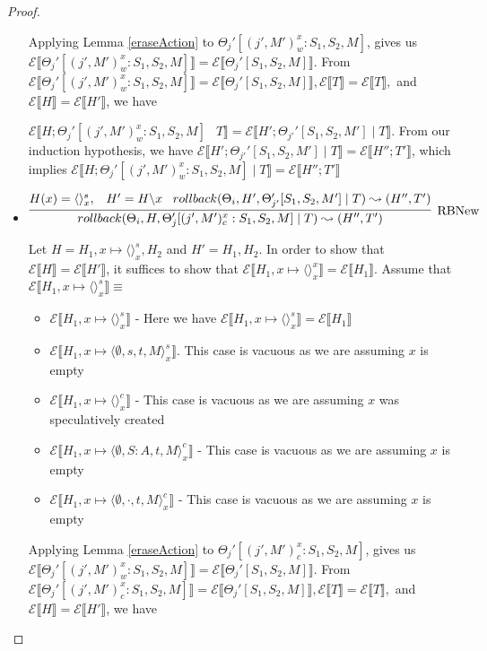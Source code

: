 \documentclass[9pt]{article}
\newcommand{\erase}[1]{\mathcal{E}\llbracket #1 \rrbracket}
\begin{document}
\begin{proof}
\begin{itemize}
Applying Lemma \ref{eraseAction} to $\Theta_j'[(j', M')_w^x : S_1, S_2, M]$, gives us $\erase{\Theta_j'[(j', M')_w^x : S_1, S_2, M]} = \erase{\Theta_j'[S_1, S_2, M]}$.  From $\erase{\Theta_j'[(j', M')_w^x : S_1, S_2, M]} = \erase{\Theta_j'[S_1, S_2, M]}, \erase{T} = \erase{T}, $ and $\erase{H} = \erase{H'}$, we have 

$\erase{H; \Theta_j'[(j', M')_w^x : S_1, S_2, M] \; \ \; T} = \erase{H'; \Theta_{j'}'[S_1, S_2, M'] \; | \; T}$.  From our induction hypothesis, we have $\erase{H'; \Theta_{j'}'[S_1, S_2, M'] \; | \; T} = \erase{H''; T'}$, which implies $\erase{H; \Theta_j'[(j', M')_w^x : S_1, S_2, M] \; | \; T} = \erase{H''; T'}$

\item $\infer[\text{RBNew}]{rollback(\Theta_i, H, \Theta_j'[(j', M')_c^x : S_1, S_2, M] \; | \; T) \leadsto (H'', T')}{H(x) = \langle\rangle_x^s, \;\;\; H' = H \backslash x \;\;\; rollback(\Theta_i, H', \Theta_{j'}'[S_1, S_2, M'] \; | \; T) \leadsto (H'', T')}$

Let $H = H_1, x\mapsto \langle \rangle_x^s, H_2$ and $H' = H_1, H_2$.  In order to show that $\erase{H} = \erase{H'}$, it suffices to show that $\erase{H_1, x \mapsto \langle \rangle_x^x} = \erase{H_1}$.  Assume that $\erase{H_1, x \mapsto \langle\rangle_x^s} \equiv $

\begin{itemize}
\item  $\erase{H_1, x \mapsto \langle\rangle_x^s} $ - Here we have $\erase{H_1, x\mapsto \langle\rangle_x^s} = \erase{H_1}$
\item  $\erase{H_1, x \mapsto \langle \emptyset, s, t, M\rangle_x^s}$.  This case is vacuous as we are assuming $x$ is empty
\item  $\erase{H_1, x \mapsto \langle\rangle_x^c} $ - This case is vacuous as we are assuming $x$ was speculatively created
\item  $\erase{H_1, x\mapsto \langle\emptyset, S : A, t, M\rangle_x^c} $ - This case is vacuous as we are assuming $x$ is empty
\item  $\erase{H_1, x \mapsto \langle\emptyset, \cdot, t, M\rangle_x^c} $ - This case is vacuous as we are assuming $x$ is empty
\end{itemize}

Applying Lemma \ref{eraseAction} to $\Theta_j'[(j', M')_c^x : S_1, S_2, M]$, gives us $\erase{\Theta_j'[(j', M')_w^x : S_1, S_2, M]} = \erase{\Theta_j'[S_1, S_2, M]}$.  From $\erase{\Theta_j'[(j', M')_c^x : S_1, S_2, M]} = \erase{\Theta_j'[S_1, S_2, M]}, \erase{T} = \erase{T}, $ and $\erase{H} = \erase{H'}$, we have 


\end{itemize}
\end{proof}
\end{document}
